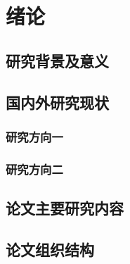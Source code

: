 \setlength{\parindent}{2em}

\chapter{绪\hspace{2em}论}

\section{研究背景及意义}


\section{国内外研究现状}

\subsection{研究方向一}


\subsection{研究方向二}


\section{论文主要研究内容}


\section{论文组织结构}

